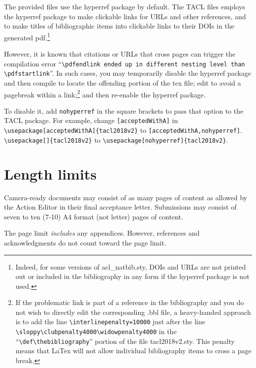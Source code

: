 \documentclass[11pt,a4paper]{article}
\newcommand{\styleFileVersion}{tacl2018v2}
\begin{document}
The provided files use the hyperref package by default. The TACL files
employs the hyperref package to make clickable links for URLs and other references,
and to make titles of bibliographic items into clickable links to their DOIs
in the generated pdf.\footnote{Indeed, for some versions of acl\_natbib.sty,
DOIs and URLs are not printed out or included in the bibliography in any form
if the hyperref package is not used.}

However, it is known that citations or URLs that cross pages can trigger the
compilation error ``{\tt {\textbackslash}pdfendlink ended up in different nesting
level than {\textbackslash}pdfstartlink}''.  In such cases, you may temporarily
disable the hyperref package and then compile to locate the offending portion of
the tex file; edit to avoid a pagebreak within a link;\footnote{If the problematic
link is part of a reference in the bibliography and you do not wish to
directly edit the corresponding .bbl file, a heavy-handed approach is to
add the line
{\tt \textbackslash interlinepenalty=10000}
just after the line
{\tt \textbackslash sloppy\textbackslash clubpenalty4000\textbackslash widowpenalty4000} in the
``{\tt \textbackslash def\textbackslash thebibliography}'' portion
of the file \styleFileVersion.sty.  This penalty means that LaTex will not allow
individual bibliography items to cross a page break.
}
 and then re-enable the
hyperref package.

To disable it,
add {\tt nohyperref} in the square brackets to pass that option to the TACL package.
For example, change
\iftaclpubformat
\verb+[acceptedWithA]+ in
{\footnotesize {\tt {\textbackslash usepackage}[acceptedWithA]\{\styleFileVersion\}}}
to
\verb+[acceptedWithA,nohyperref]+.
\else
{\tt {\textbackslash usepackage}[]\{\styleFileVersion\}}
to
{\tt {\textbackslash usepackage}[nohyperref]\{\styleFileVersion\}}.
\fi



\section{Length limits}
\label{sec:length}

\iftaclpubformat
Camera-ready documents may consist of as many pages of content as allowed by
the Action Editor in their final acceptance letter.
\else
Submissions may consist of seven to ten (7-10) A4 format (not letter) pages of
content.
\fi

The page limit \emph{includes} any appendices. However, references
\iftaclpubformat
and acknowledgments
\fi
do not count
toward the page limit.
\end{document}
